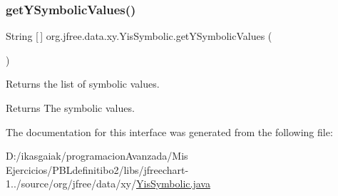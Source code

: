 \subsubsection{\texorpdfstring{get\+Y\+Symbolic\+Values()}{getYSymbolicValues()}}
{\footnotesize\ttfamily String \mbox{[}$\,$\mbox{]} org.\+jfree.\+data.\+xy.\+Yis\+Symbolic.\+get\+Y\+Symbolic\+Values (\begin{DoxyParamCaption}{ }\end{DoxyParamCaption})}

Returns the list of symbolic values.

\begin{DoxyReturn}{Returns}
The symbolic values. 
\end{DoxyReturn}


The documentation for this interface was generated from the following file\+:\begin{DoxyCompactItemize}
\item 
D\+:/ikasgaiak/programacion\+Avanzada/\+Mis Ejercicios/\+P\+B\+Ldefinitibo2/libs/jfreechart-\/1../source/org/jfree/data/xy/\mbox{\hyperlink{_yis_symbolic_8java}{Yis\+Symbolic.\+java}}\end{DoxyCompactItemize}
